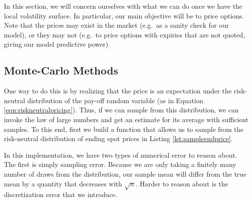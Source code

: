 \documentclass[12pt]{article}
\numberwithin{equation}{section}
\begin{document}
In this section, we will concern ourselves with what we can do once we have the
local volatility surface. In particular, our main objective will be to 
price options. Note that the prices may exist in the market (e.g.\ as a sanity
check for our model), or they may not (e.g.\ to price options with expiries that
are not quoted, giving our model predictive power).

\subsection{Monte-Carlo Methods}
\label{subsec:montecarlopricing}

One way to do this is by realizing that the price is an expectation under the
risk-neutral distribution of the pay-off random variable (as in Equation
\ref{eqn:riskneutralpricing}). Thus, if we can sample
from this distribution, we can invoke the law of large numbers and get an
estimate for its average with sufficient samples. To this end, first we build a
function that allows us to sample from the risk-neutral distribution of ending
spot prices in Listing \ref{lst:sampleendprice}.

In this implementation, we have two types of numerical error to reason about.
The first is simply sampling error. Because we are only taking a finitely many
number of draws from the distribution, our sample mean will differ from the true
mean by a quantity that decreases with $\sqrt{n}$. Harder to reason about is the
discretization error that we introduce. 

\end{document}
